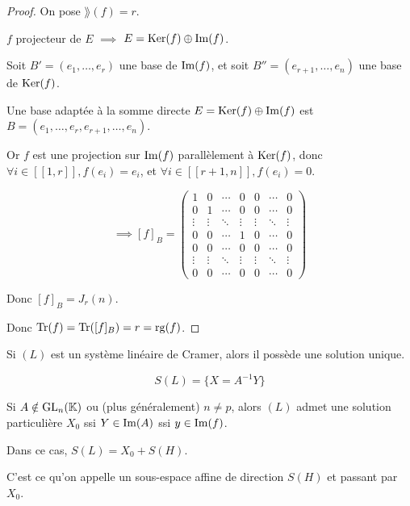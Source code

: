 \documentclass[12pt,a4paper]{report}
\begin{document}
\begin{proof}
    On pose $\rang(f) = r$.

    $f$ projecteur de $E$ $\implies$ $E = \mathrm{Ker}(f) \oplus \mathrm{Im}(f)$.

    Soit $B' = (e_1,\dots,e_r)$ une base de $\mathrm{Im}(f)$, et soit $B'' = (e_{r+1},\dots,e_n)$ une base de $\mathrm{Ker}(f)$.

    Une base adaptée à la somme directe $E = \mathrm{Ker}(f) \oplus \mathrm{Im}(f)$ est $B = (e_1,\dots,e_r,e_{r+1},\dots,e_n)$.

    Or $f$ est une projection sur $\mathrm{Im}(f)$ parallèlement à $\mathrm{Ker}(f)$, donc $\forall i \in [\![1,r]\!], f(e_i) = e_i$, et $\forall i \in [\! [r+1,n]\!], f(e_i) = 0$.

    $$\implies [f]_B = \left(\begin{matrix}
        1 & 0 & \cdots & 0 & 0 & \cdots & 0 \\
        0 & 1 & \cdots & 0 & 0 & \cdots & 0 \\
        \vdots & \vdots & \ddots & \vdots & \vdots & \ddots & \vdots \\
        0 & 0 & \cdots & 1 & 0 & \cdots & 0 \\
        0 & 0 & \cdots & 0 & 0 & \cdots & 0 \\
        \vdots & \vdots & \ddots & \vdots & \vdots & \ddots & \vdots \\
        0 & 0 & \cdots & 0 & 0 & \cdots & 0
    \end{matrix}\right)$$

    Donc $[f]_B = J_r(n)$.

    Donc $\mathrm{Tr}(f) = \mathrm{Tr}([f]_B) = r = \mathrm{rg}(f)$.
\end{proof}

\begin{property}
    Si $(L)$ est un système linéaire de Cramer, alors il possède une solution unique.

    $$S(L) = \{ X = A^{-1} Y \}$$

\end{property}

\begin{property}
    Si $A \notin \mathrm{GL}_n(\mathbb{K})$ ou (plus généralement) $n\ne p$, alors $(L)$ admet une solution particulière $X_0$ ssi $Y \in \mathrm{Im}(A)$ ssi $y \in \mathrm{Im}(f)$.

    Dans ce cas, $S(L) = X_0 + S(H)$.

    C'est ce qu'on appelle un sous-espace affine de direction $S(H)$ et passant par $X_0$.
\end{property}
\end{document}
